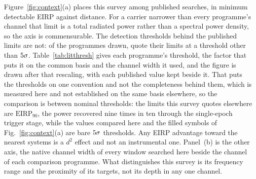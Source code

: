 Figure~\ref{fig:context}(a) places this survey among published searches,
in minimum detectable EIRP against distance. For a carrier narrower than
every programme's channel that limit is a total radiated power rather than
a spectral power density, so the axis is commensurable. The detection
thresholds behind the published limits are not: of the \LtNProg{}
programmes drawn, \LtNRescaled{} quote their limits at a threshold other
than $\LtCommonSnr\sigma$. Table~\ref{tab:litthresh} gives each programme's
threshold, the factor that puts it on the common basis and the channel width
it used, and the figure is drawn after that rescaling, with each published
value kept beside it. That
puts the thresholds on one convention and not the completeness behind them,
which is measured here and not established on the same basis elsewhere, so
the comparison is between nominal thresholds: the limits this survey quotes
elsewhere are $\mathrm{EIRP}_{90}$, the power recovered nine times in ten
through the single-epoch trigger stage, while the values compared here and
the filled symbols of Fig.~\ref{fig:context}(a) are bare
$\LtCommonSnr\sigma$ thresholds. Any EIRP advantage toward the nearest
systems is a $d^{2}$ effect and not an instrumental one.
Panel~(b) is the other axis, the native channel width of every window
searched here beside the channel of each comparison programme. What
distinguishes this survey is its frequency range and the proximity of its
targets, not its depth in any one channel.

\begin{table}
\centering
\caption{The comparison programmes of Figure~\ref{fig:context}, each on its
own detection threshold and on the common $\LtCommonSnr\sigma$ basis.
$\mathrm{EIRP}_{\rm min}$ is the deepest limit each paper reports, and the
factor is $\LtCommonSnr/(\mathrm{S/N})$, the minimum detectable flux being
linear in the threshold in every one of their own expressions for it.}
\label{tab:litthresh}
\scriptsize
\setlength{\tabcolsep}{4pt}

\end{table}

